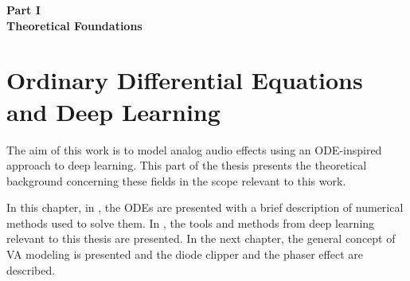 \cleardoublepage
\thispagestyle{empty}
\begin{center}
\vspace*{3cm}
{\huge \bf Part I}\\ \vspace*{1cm}
{\Huge \bf Theoretical Foundations}\\\vspace*{0.2cm}
\begin{figure}[ht]
\centering
\vspace{2cm}
\def\svgwidth{\columnwidth}
\scalebox{0.8}{}
\end{figure}
\end{center}
\label{par:part1}
\newpage
\quad
\thispagestyle{empty}
\newpage



\chapter{Ordinary Differential Equations and Deep Learning}
\label{chapter:odes_and_dl}

The aim of this work is to model analog audio effects using an \ac{ODE}-inspired approach to deep learning. This part of the thesis presents the theoretical background concerning these fields in the scope relevant to this work. 

In this chapter, in , the \acp{ODE} are presented with a brief description of numerical methods used to solve them. In , the tools and methods from deep learning relevant to this thesis are presented. In the next chapter, the general concept of \ac{VA} modeling is presented and the diode clipper and the phaser effect are described.




